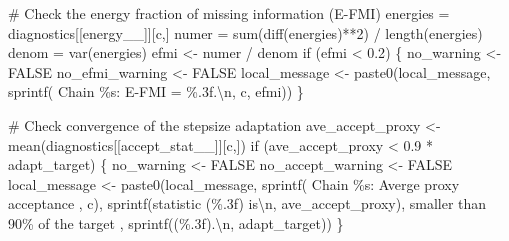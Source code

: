\documentclass[
  letterpaper,
  DIV=11,
  numbers=noendperiod]{scrartcl}
\newenvironment{Shaded}{\begin{snugshade}}{\end{snugshade}}
\newcommand{\BuiltInTok}[1]{\textcolor[rgb]{0.00,0.23,0.31}{#1}}
\newcommand{\CharTok}[1]{\textcolor[rgb]{0.13,0.47,0.30}{#1}}
\newcommand{\CommentTok}[1]{\textcolor[rgb]{0.37,0.37,0.37}{#1}}
\newcommand{\ControlFlowTok}[1]{\textcolor[rgb]{0.00,0.23,0.31}{#1}}
\newcommand{\DecValTok}[1]{\textcolor[rgb]{0.68,0.00,0.00}{#1}}
\newcommand{\FloatTok}[1]{\textcolor[rgb]{0.68,0.00,0.00}{#1}}
\newcommand{\NormalTok}[1]{\textcolor[rgb]{0.00,0.23,0.31}{#1}}
\newcommand{\OperatorTok}[1]{\textcolor[rgb]{0.37,0.37,0.37}{#1}}
\newcommand{\SpecialCharTok}[1]{\textcolor[rgb]{0.37,0.37,0.37}{#1}}
\newcommand{\StringTok}[1]{\textcolor[rgb]{0.13,0.47,0.30}{#1}}
\begin{document}
\begin{Shaded}
\begin{Highlighting}[]
    \CommentTok{\# Check the energy fraction of missing information (E{-}FMI)}
\NormalTok{    energies }\OperatorTok{=}\NormalTok{ diagnostics[[}\StringTok{\textquotesingle{}energy\_\_\textquotesingle{}}\NormalTok{]][c,]}
\NormalTok{    numer }\OperatorTok{=} \BuiltInTok{sum}\NormalTok{(diff(energies)}\OperatorTok{**}\DecValTok{2}\NormalTok{) }\OperatorTok{/}\NormalTok{ length(energies)}
\NormalTok{    denom }\OperatorTok{=}\NormalTok{ var(energies)}
\NormalTok{    efmi }\OperatorTok{\textless{}{-}}\NormalTok{ numer }\OperatorTok{/}\NormalTok{ denom}
    \ControlFlowTok{if}\NormalTok{ (efmi }\OperatorTok{\textless{}} \FloatTok{0.2}\NormalTok{) \{}
\NormalTok{      no\_warning }\OperatorTok{\textless{}{-}}\NormalTok{ FALSE}
\NormalTok{      no\_efmi\_warning }\OperatorTok{\textless{}{-}}\NormalTok{ FALSE}
\NormalTok{      local\_message }\OperatorTok{\textless{}{-}} 
\NormalTok{        paste0(local\_message, }
\NormalTok{               sprintf(}\StringTok{\textquotesingle{}  Chain }\SpecialCharTok{\%s}\StringTok{: E{-}FMI = }\SpecialCharTok{\%.3f}\StringTok{.}\CharTok{\textbackslash{}n}\StringTok{\textquotesingle{}}\NormalTok{, c, efmi))}
\NormalTok{    \}}
    
    \CommentTok{\# Check convergence of the stepsize adaptation}
\NormalTok{    ave\_accept\_proxy }\OperatorTok{\textless{}{-}}\NormalTok{ mean(diagnostics[[}\StringTok{\textquotesingle{}accept\_stat\_\_\textquotesingle{}}\NormalTok{]][c,])}
    \ControlFlowTok{if}\NormalTok{ (ave\_accept\_proxy }\OperatorTok{\textless{}} \FloatTok{0.9} \OperatorTok{*}\NormalTok{ adapt\_target) \{}
\NormalTok{      no\_warning }\OperatorTok{\textless{}{-}}\NormalTok{ FALSE}
\NormalTok{      no\_accept\_warning }\OperatorTok{\textless{}{-}}\NormalTok{ FALSE}
\NormalTok{      local\_message }\OperatorTok{\textless{}{-}} 
\NormalTok{        paste0(local\_message,}
\NormalTok{               sprintf(}\StringTok{\textquotesingle{}  Chain }\SpecialCharTok{\%s}\StringTok{: Averge proxy acceptance \textquotesingle{}}\NormalTok{, c),}
\NormalTok{               sprintf(}\StringTok{\textquotesingle{}statistic (}\SpecialCharTok{\%.3f}\StringTok{) is}\CharTok{\textbackslash{}n}\StringTok{\textquotesingle{}}\NormalTok{, ave\_accept\_proxy),}
                       \StringTok{\textquotesingle{}           smaller than 90}\SpecialCharTok{\% o}\StringTok{f the target \textquotesingle{}}\NormalTok{,}
\NormalTok{               sprintf(}\StringTok{\textquotesingle{}(}\SpecialCharTok{\%.3f}\StringTok{).}\CharTok{\textbackslash{}n}\StringTok{\textquotesingle{}}\NormalTok{, adapt\_target))}
\NormalTok{    \}}
    

\end{Highlighting}
\end{Shaded}
\end{document}
